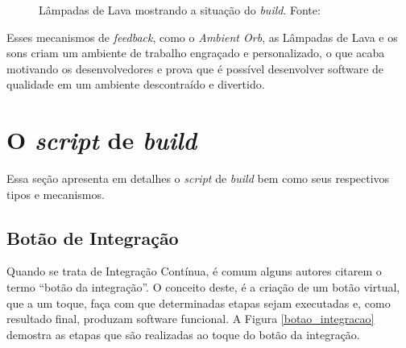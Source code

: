 \begin{figure}[ht]
    \centering
    \caption{Lâmpadas de Lava mostrando a situação do \textit{build}. Fonte: \cite{LAVA-LAMPS}}
    \label{lava_lamps}
\end{figure}

Esses mecanismos de \textit{feedback}, como o \textit{Ambient Orb}, as Lâmpadas de Lava e os sons criam um ambiente de trabalho engraçado e personalizado, o que acaba motivando os desenvolvedores e prova que é possível desenvolver software de qualidade em um ambiente descontraído e divertido.

\section{O \textit{script} de \textit{build}}

Essa seção apresenta em detalhes o \textit{script} de \textit{build} bem como seus respectivos tipos e mecanismos.

\subsection{Botão de Integração}

Quando se trata de Integração Contínua, é comum alguns autores citarem o termo ``botão da integração''. O conceito deste, é a criação de um botão virtual, que a um toque, faça com que determinadas etapas sejam executadas e, como resultado final, produzam software funcional. A Figura \ref{botao_integracao} demostra as etapas que são realizadas ao toque do botão da integração.

